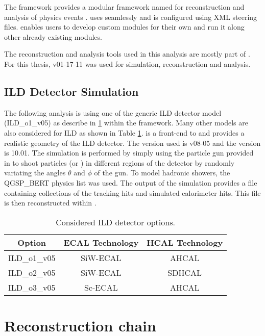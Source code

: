 The \ilcsoft framework provides a modular \cpp framework named \marlin for reconstruction and analysis of physics events \cite{Gaede:2006pj}. \marlin uses \lcio seamlessly and is configured using XML steering files. \marlin enables users to develop custom modules for their own and run it along other already existing modules.

The reconstruction and analysis tools used in this analysis are mostly part of \ilcsoft. For this thesis, \ilcsoft v01-17-11 was used for simulation, reconstruction and analysis.

\subsection{ILD Detector Simulation}

The following analysis is using one of the generic ILD detector model (ILD\_o1\_v05) as describe in \ref{} within the \mokka framework. Many other models are also considered for ILD as shown in Table \ref{table:ILDOptions}. \mokka is a front-end to \geant and provides a realistic geometry of the ILD detector. The \mokka version used is v08-05 and the \geant version is 10.01.
The simulation is performed by simply using the particle gun provided in \geant to shoot particles (\piminus or \kzeroL) in different regions of the detector by randomly variating the angles $\theta$ and $\phi$ of the gun. To model hadronic showers, the QGSP\_BERT physics list was used. The output of the simulation provides a \lcio file containing collections of the tracking hits and simulated calorimeter hits. This file is then reconstructed within \marlin.

\begin{table}[htb!]
  \centering
  \caption{Considered ILD detector options.} \label{table:ILDOptions}
  \begin{tabular}{|c|c|c|}
    \hline
    Option & ECAL Technology & HCAL Technology \\
    \hline
    ILD\_o1\_v05 & SiW-ECAL & AHCAL \\
    ILD\_o2\_v05 & SiW-ECAL & SDHCAL \\
    ILD\_o3\_v05 & Sc-ECAL & AHCAL \\
    \hline
  \end{tabular}
\end{table}

\section{Reconstruction chain}

